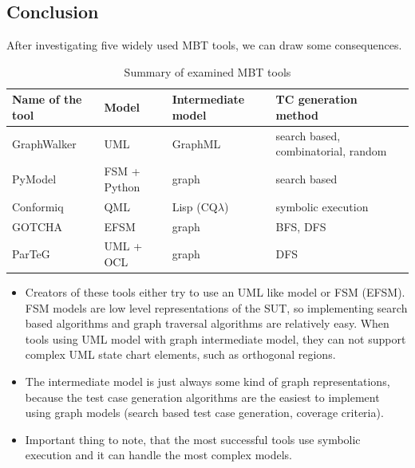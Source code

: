 \documentclass{article}
\begin{document}

\subsection{Conclusion}
\label{sub:conclusion}

After investigating five widely used MBT tools, we can draw some consequences.

\begin{table}[htb]
\begin{center}
\begin{tabular}{|l|l|l|l|}
\hline
	\textbf{Name of the tool} & \textbf{Model} & \textbf{Intermediate model} & \textbf{TC generation method}\\\hline
	GraphWalker & UML & GraphML & search based, combinatorial, random\\\hline
	PyModel & FSM + Python & graph & search based\\\hline
	Conformiq & QML & Lisp (CQ$\lambda$) & symbolic execution\\\hline
	GOTCHA & EFSM & graph & BFS, DFS\\\hline
	ParTeG & UML + OCL & graph & DFS\\
\hline
\end{tabular}
\end{center}
\caption{\label{tab:toolssummary} Summary of examined MBT tools}
\end{table}

\begin{itemize}
	\item Creators of these tools either try to use an UML like model or FSM (EFSM). FSM models are low level representations of the SUT, so implementing search based algorithms and graph traversal algorithms are relatively easy. When tools using UML model with graph intermediate model, they can not support complex UML state chart elements, such as orthogonal regions.
	\item The intermediate model is just always some kind of graph representations, because the test case generation algorithms are the easiest to implement using graph models (search based test case generation, coverage criteria).
	\item Important thing to note, that the most successful tools use symbolic execution and it can handle the most complex models.
\end{itemize}


\end{document}
